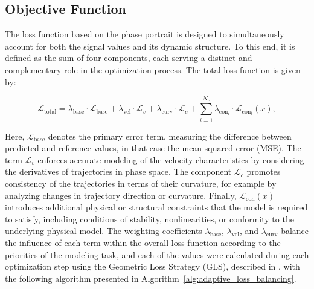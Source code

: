 \documentclass[11pt, oneside]{article}
\begin{document}
\subsection{Objective Function}

The loss function based on the phase portrait is designed to simultaneously account for both the  signal values and its dynamic structure. To this end, it is defined as the sum of four components, each serving a distinct and complementary role in the optimization process. The total loss function is given by:

\begin{equation}
    \mathcal{L}_{\mathrm{total}} = \lambda_{\mathrm{base}} \cdot \mathcal{L}_{\mathrm{base}} + \lambda_{\mathrm{vel}} \cdot \mathcal{L}_{v} + \lambda_{\mathrm{curv}} \cdot \mathcal{L}_{c} + \sum^{N_c}_{i=1} \lambda_{\mathrm{con}_i} \cdot \mathcal{L}_{\mathrm{con}_i}(x),
    \label{eq:loss_function}
\end{equation}

Here, \(\mathcal{L}_{\mathrm{base}}\) denotes the primary error term,  measuring the difference between predicted and reference values, in that case the mean squared error (MSE). The term \(\mathcal{L}_{v}\) enforces accurate modeling of the velocity characteristics by considering the derivatives of trajectories in phase space. The component \(\mathcal{L}_{c}\) promotes consistency of the trajectories in terms of their curvature, for example by analyzing changes in trajectory direction or curvature. Finally, \(\mathcal{L}_{\mathrm{con}}(x)\) introduces additional physical or structural constraints that the model is required to satisfy, including conditions of stability, nonlinearities, or conformity to the underlying physical model. The weighting coefficients \(\lambda_{\mathrm{base}}\), \(\lambda_{\mathrm{vel}}\),  and \(\lambda_{\mathrm{curv}}\) balance the influence of each term within the overall loss function according to the priorities of the modeling task, and each of the values were calculated during each optimization step using the Geometric Loss Strategy (GLS), described in \cite{Cipolla2018, Chen2018}. with the following algorithm presented in Algorithm~\ref{alg:adaptive_loss_balancing}.
\end{document}
